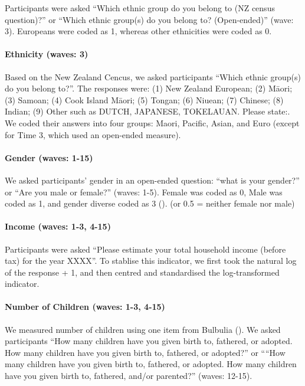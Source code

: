 \documentclass[
  singlecolumn,
  9pt]{article}
\let\oldparagraph\paragraph
\renewcommand{\paragraph}[1]{\oldparagraph{#1}\mbox{}}
\begin{document}
Participants were asked ``Which ethnic group do you belong to (NZ census
question)?'' or ``Which ethnic group(s) do you belong to? (Open-ended)''
(wave: 3). Europeans were coded as 1, whereas other ethnicities were
coded as 0.

\paragraph{Ethnicity (waves: 3)}\label{ethnicity-waves-3}

Based on the New Zealand Cencus, we asked participants ``Which ethnic
group(s) do you belong to?''. The responses were: (1) New Zealand
European; (2) Māori; (3) Samoan; (4) Cook Island Māori; (5) Tongan; (6)
Niuean; (7) Chinese; (8) Indian; (9) Other such as DUTCH, JAPANESE,
TOKELAUAN. Please state:. We coded their answers into four groups:
Maori, Pacific, Asian, and Euro (except for Time 3, which used an
open-ended measure).

\paragraph{Gender (waves: 1-15)}\label{gender-waves-1-15}

We asked participants' gender in an open-ended question: ``what is your
gender?'' or ``Are you male or female?'' (waves: 1-5). Female was coded
as 0, Male was coded as 1, and gender diverse coded as 3
(). (or 0.5
= neither female nor male)

\paragraph{Income (waves: 1-3, 4-15)}\label{income-waves-1-3-4-15}

Participants were asked ``Please estimate your total household income
(before tax) for the year XXXX''. To stablise this indicator, we first
took the natural log of the response + 1, and then centred and
standardised the log-transformed indicator.

\paragraph{Number of Children (waves: 1-3,
4-15)}\label{number-of-children-waves-1-3-4-15}

We measured number of children using one item from Bulbulia
(). We asked participants ``How many
children have you given birth to, fathered, or adopted. How many
children have you given birth to, fathered, or adopted?'' or ````How
many children have you given birth to, fathered, or adopted. How many
children have you given birth to, fathered, and/or parented?'' (waves:
12-15).
\end{document}

